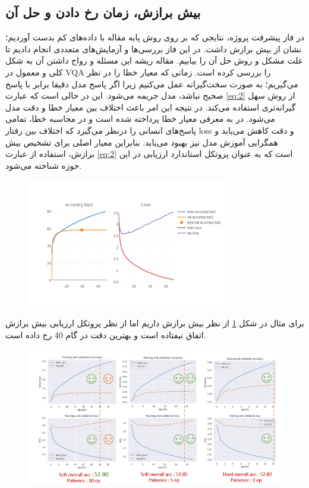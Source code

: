 {{	}

	\subsection{بیش برازش، زمان رخ دادن و حل آن}
	{
		در فاز پیشرفت پروژه، نتایجی که بر روی روش پایه مقاله با داده‌های کم بدست آوردیم؛ نشان از بیش برازش داشت. در این فاز بررسی‌ها و آزمایش‌های متعددی انجام دادیم تا علت مشکل و روش حل آن را بیابیم.
	مقاله
		\cite{ilievski2017simple}
		ریشه این مسئله و رواج داشتن آن به شکل کلی و معمول در VQA را بررسی کرده است.   زمانی که معیار خطا را 
		 در نظر می‌گیریم؛ به صورت سخت‌گیرانه عمل می‌کنیم زیرا اگر پاسخ مدل دقیقا برابر با پاسخ صحیح نباشد، مدل جریمه می‌شود. این در حالی است که عبارت
		\ref{eq:2}
		  از روش سهل گیرانه‌تری استفاده می‌کند. در نتیجه این امر باعث اختلاف بین معیار خطا
		و دقت  مدل می‌شود. در
	    \cite{ilievski2017simple}
		به معرفی معیار خطا
		  پرداخته شده است و در محاسبه خطا، تمامی پاسخ‌های انسانی را درنظر می‌گیرد که اختلاف بین رفتار loss و دقت کاهش می‌یابد و همگرایی آموزش مدل نیز بهبود می‌یابد. بنابراین معیار اصلی برای تشخیص بیش برازش، استفاده از عبارت
		  \ref{eq:2}
		 است که به عنوان پروتکل استاندارد ارزیابی در این حوزه شناخته می‌شود. 
		 \begin{figure}
		 	\centering
		 	\includegraphics[scale=1]{images/i2.jpg}
		 	\caption{}
		 	\label{fig:9}
		 \end{figure}
		 برای مثال در شکل
		  \ref{fig:9}
		  از نظر
		   بیش برازش داریم اما از نظر پروتکل ارزیابی بیش برازش اتفاق نیفتاده است و بهترین دقت در گام 40 رخ داده است.
		   
		   \begin{figure}[h]
		   	\centering
		   	\includegraphics[scale=0.7]{images/i3.png}
		   	\caption{}
		   	\label{fig:10}
		   \end{figure}
	   
}}
